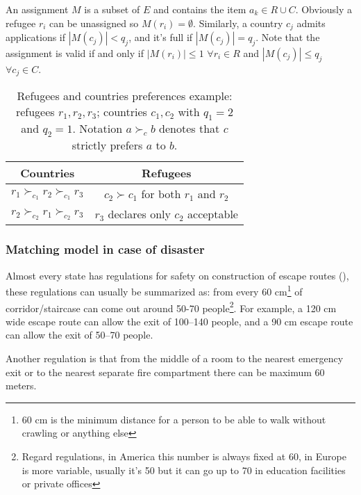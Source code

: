 \documentclass[letterpaper]{article} %
\begin{document}
    An assignment $M$ is a subset of $E$ and contains the item $a_k \in R \cup C$.
    Obviously a refugee $r_i$ can be unassigned so $M \left( r_i \right) = \emptyset$.
    Similarly, a country $c_j$ admits applications if $\left| M \left( c_j \right) \right| < q_j$, and it's full if $\left| M \left( c_j \right) \right| = q_j$.
    Note that the assignment is valid if and only if $\left| M \left( r_i \right) \right| \leq 1$ $\forall r_i \in R$ and $\left| M \left( c_j \right) \right| \leq q_j$ $\forall c_j \in C$.

    \begin{table}[!htb]
        \begin{tabular}{c|c}
            \hline Countries & Refugees \\
            \hline $r_1 \succ_{c_1} r_2 \succ_{c_1} r_3$ & $c_2 \succ c_1$ for both $r_1$ and $r_2$ \\
            $r_2 \succ_{c_2} r_1 \succ_{c_2} r_3$ & $r_3$ declares only $c_2$ acceptable \\
            \hline
        \end{tabular}
        \caption{Refugees and countries preferences example: refugees $r_1, r_2, r_3$; countries $c_1, c_2$ with $q_1 = 2$ and $q_2 = 1$. Notation $a \succ_c b$ denotes that $c$ strictly prefers $a$ to $b$.}
        \label{tab:countries-refugees}
    \end{table}

    \subsubsection{Matching model in case of disaster}\label{matching-model-in-case-of-disaster}%
    Almost every state has regulations for safety on construction of escape routes (\citet{it-81-2008,uk-1541-2005,usa-1910-1974,cee-654-1989,cee-567-1977}), these regulations can usually be summarized as: from every 60 cm\footnote{60 cm is the minimum distance for a person to be able to walk without crawling or anything else} of corridor/staircase can come out around 50-70 people\footnote{Regard regulations, in America this number is always fixed at 60, in Europe is more variable, usually it's 50 but it can go up to 70 in education facilities or private offices}.
    For example, a 120 cm wide escape route can allow the exit of 100--140 people, and a 90 cm escape route can allow the exit of 50--70 people.

    Another regulation is that from the middle of a room to the nearest emergency exit or to the nearest separate fire compartment there can be maximum 60 meters.
    
\end{document}
